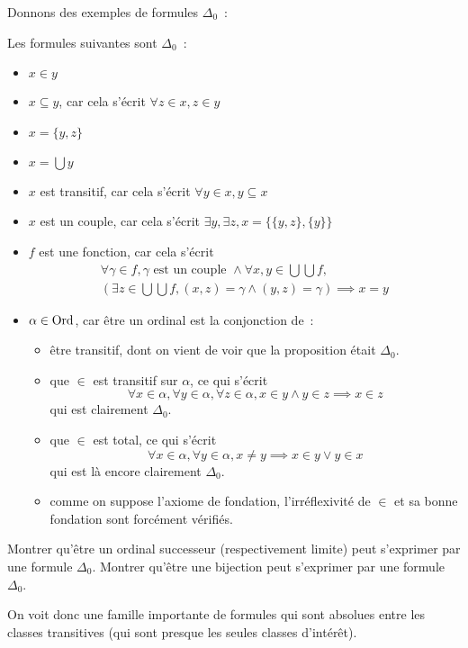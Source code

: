 Donnons des exemples de formules $\Delta_0$~:

\begin{example}
  Les formules suivantes sont $\Delta_0$~:
  \begin{itemize}
  \item $x\in y$
  \item $x\subseteq y$, car cela s'écrit $\forall z \in x, z \in y$
  \item $x = \{y,z\}$
  \item $x = \bigcup y$
  \item $x$ est transitif, car cela s'écrit $\forall y \in x, y\subseteq x$
  \item $x$ est un couple, car cela s'écrit
    $\exists y,\exists z, x = \{\{y,z\},\{y\}\}$
  \item $f$ est une fonction, car cela s'écrit
    \begin{multline*}
      \forall \gamma \in f, \gamma\text{ est un couple }\land
      \forall x,y \in \bigcup \bigcup f,\\
      (\exists z \in \bigcup\bigcup f,
      (x,z) = \gamma \land (y,z) = \gamma) \implies x = y
    \end{multline*}
  \item $\alpha \in \operatorname{Ord}$, car être un ordinal est la conjonction de~:
    \begin{itemize}
    \item être transitif, dont on vient de voir que la proposition était
      $\Delta_0$.
    \item que $\in$ est transitif sur $\alpha$, ce qui s'écrit
      \[\forall x \in \alpha, \forall y \in \alpha, \forall z \in \alpha,
      x\in y \land y \in z \implies x \in z\] qui est clairement $\Delta_0$.
    \item que $\in$ est total, ce qui s'écrit
      \[\forall x \in \alpha, \forall y \in \alpha, x \neq y \implies
      x \in y \lor y \in x\] qui est là encore clairement $\Delta_0$.
    \item comme on suppose l'axiome de fondation, l'irréflexivité de $\in$ et sa
      bonne fondation sont forcément vérifiés.
    \end{itemize}
  \end{itemize}
\end{example}

\begin{exercise}
  Montrer qu'être un ordinal successeur (respectivement limite) peut s'exprimer
  par une formule $\Delta_0$. Montrer qu'être une bijection peut s'exprimer
  par une formule $\Delta_0$.
\end{exercise}

On voit donc une famille importante de formules qui sont absolues entre les
classes transitives (qui sont presque les seules classes d'intérêt).
